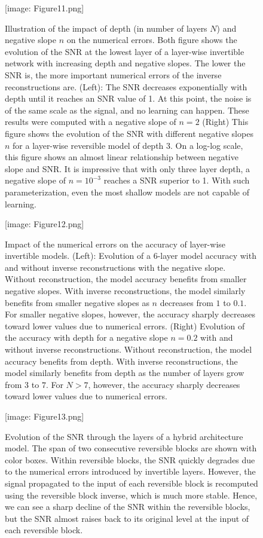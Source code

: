 \documentclass[twocolumn]{bmcart}
\def\texttt{[image: ]}
\begin{document}
\begin{backmatter}
\begin{figure}[t]
\texttt{[image: Figure11.png]}
\caption{
Illustration of the impact of depth (in number of layers $N$) and negative slope $n$ on the numerical errors.
Both figure shows the evolution of the SNR at the lowest layer of a layer-wise invertible network with increasing depth and negative slopes.
The lower the SNR is, the more  important numerical errors of the inverse reconstructions are.
(Left): The SNR decreases exponentially with depth until it reaches an SNR value of 1.
At this point, the noise is of the same scale as the signal, and no learning can happen.
These results were computed with a negative slope of $n=2$
(Right) This figure shows the evolution of the SNR with different negative slopes $n$ for a layer-wise reversible model of depth 3.
On a log-log scale, this figure shows an almost linear relationship between negative slope and SNR.
It is impressive that with only three layer depth, a negative slope of $n=10^{-3}$ reaches a SNR superior to 1.
With such parameterization, even the most shallow models are not capable of learning.
}
\end{figure}

\begin{figure}[t]
\texttt{[image: Figure12.png]}
\caption{
Impact of the numerical errors on the accuracy of layer-wise invertible models.
(Left): Evolution of a 6-layer model accuracy with and without inverse reconstructions with the negative slope.
Without reconstruction, the model accuracy benefits from smaller negative slopes.
With inverse reconstructions, the model similarly benefits from smaller negative slopes as $n$ decreases from $1$ to $0.1$.
For smaller negative slopes, however, the accuracy sharply decreases toward lower values due to numerical errors.
(Right) Evolution of the accuracy with depth for a negative slope $n=0.2$ with and without inverse reconstructions.
Without reconstruction, the model accuracy benefits from depth.
With inverse reconstructions, the model similarly benefits from depth as the number of layers grow from $3$ to $7$.
For $N>7$, however, the accuracy sharply decreases toward lower values due to numerical errors.
}
\end{figure}

\begin{figure}[t]
\texttt{[image: Figure13.png]}
\caption{
Evolution of the SNR through the layers of a hybrid architecture model.
The span of two consecutive reversible blocks are shown with color boxes.
Within reversible blocks, the SNR quickly degrades due to the numerical errors introduced by invertible layers.
However, the signal propagated to the input of each reversible block is recomputed using the reversible block inverse, which is much more stable.
Hence, we can see a sharp decline of the SNR within the reversible blocks, but the SNR almost raises back to its original level at the input of each reversible block.
}
\end{figure}



\end{backmatter}
\end{document}
